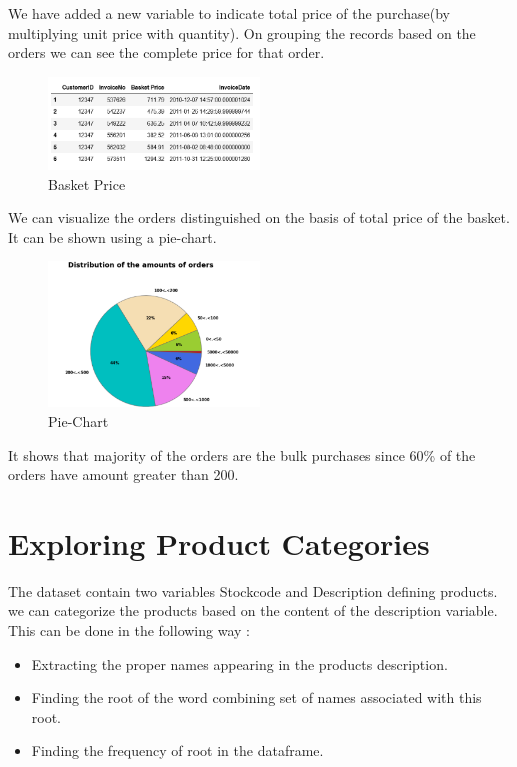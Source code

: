 We have added a new variable to indicate total price of the purchase(by multiplying unit price with quantity). On grouping the records based on the orders we can see the complete price for that order.\\

\begin{figure}[h]
\caption{Basket Price}
\label{2.5}
\centering
\includegraphics[width=0.5\textwidth]{images/2_5.PNG}
\end{figure}

We can visualize the orders distinguished on the basis of total price of the basket. It can be shown using a pie-chart.

\begin{figure}[h]
\caption{Pie-Chart}
\label{2.6}
\centering
\includegraphics[width=0.5\textwidth]{images/2_6.PNG}
\end{figure}

It shows that majority of the orders are the bulk purchases since 60\% of the orders have amount greater than 200.

\section{Exploring Product Categories}

The dataset contain two variables Stockcode and Description defining products. we can categorize the products based on the content of the description variable. This can be done in the following way :\\

\begin{itemize}
  \item Extracting the proper names appearing in the products description.
  \item Finding the root of the word combining set of names associated with this root.
  \item Finding the frequency of root in the dataframe.
 \end{itemize}
 
